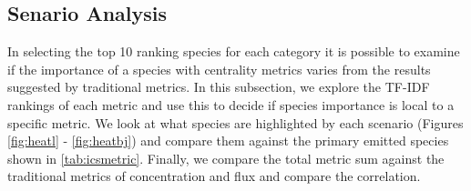 \subsection{Senario Analysis}
In selecting the top 10 ranking species for each category it is possible to examine if the importance of a species with centrality metrics varies from the results suggested by traditional metrics. In this subsection, we explore the TF-IDF rankings of each metric and use this to decide if species importance is local to a specific metric. We look at what species are highlighted by each scenario (Figures \ref{fig:heatl} - \ref{fig:heatbj}) and compare them against the primary emitted species shown in \autoref{tab:icsmetric}. Finally, we compare the total metric sum against the traditional metrics of concentration and flux and compare the correlation. 
% 
